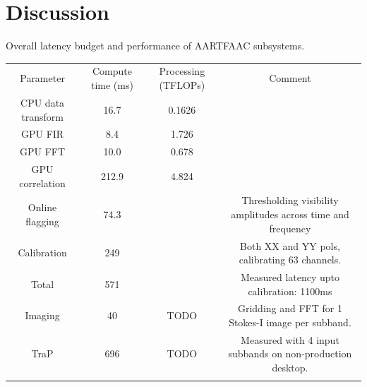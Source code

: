 \documentclass{ws-jai}
\begin{document}

\section {\label{sec:discussion} Discussion}
\begin{wstable}[h]
\caption{Overall latency budget and performance of AARTFAAC subsystems.}
\begin{tabular}{@{}cccc@{}} \toprule
Parameter & Compute time (ms) & Processing (TFLOPs) & Comment \\ \colrule
CPU data transform & 16.7 & 0.1626  \\
GPU FIR & 8.4 & 1.726\\
GPU FFT & 10.0 & 0.678  \\
GPU correlation & 212.9 & 4.824  \\
Online flagging & 74.3 &  & Thresholding visibility amplitudes across time and frequency\\
Calibration & 249 & & Both XX and YY pols, calibrating 63 channels.\\
 \colrule
Total & 571 & & Measured latency upto calibration: 1100ms \\ \colrule

Imaging & 40 & TODO & Gridding and FFT for 1 Stokes-I image per subband.\\ 
TraP & 696 & TODO & Measured with 4 input subbands on non-production desktop.\\ \colrule
\end{tabular}
\label{tab:afaac_latency}
\end{wstable}

\end{document}
